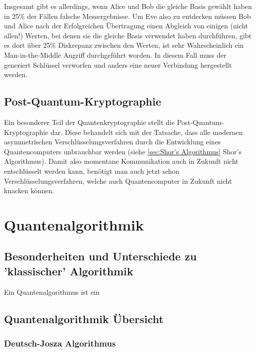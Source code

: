 Insgesamt gibt es allerdings, wenn Alice und Bob die gleiche Basis gewählt haben in 25\% der Fällen falsche Messergebnisse. 
Um Eve also zu entdecken müssen Bob und Alice nach der Erfolgreichen Übertragung einen Abgleich von einigen (nicht allen!) Werten, bei denen sie die gleiche Basis verwendet haben durchführen, gibt es dort über 25\% Diskrepanz zwischen den Werten, ist sehr Wahrscheinlich ein Man-in-the-Middle Angriff durchgeführt worden.
In diesem Fall muss der generiert Schlüssel verworfen und anders eine neuer Verbindung hergestellt werden. 


\subsection{Post-Quantum-Kryptographie}
\label{sec:Post-Quantum-Kryptographie}

Ein besonderer Teil der Quantenkryptographie stellt die Post-Quantum-Kryptographie dar.
Diese behandelt sich mit der Tatsache, dass alle modernen asymmetrischen Verschlüsselungsverfahren durch die Entwicklung eines Quantencomputers unbrauchbar werden (siehe \ref{sec:Shor's Algorithmus} Shor's Algorithmus).
Damit also momentane Kommunikation auch in Zukunft nicht entschlüsselt werden kann, benötigt man auch jetzt schon Verschlüsselungsverfahren, welche auch Quantencomputer in Zukunft nicht knacken können. \cite{postquantumwiki}


\section{Quantenalgorithmik}
\label{sec:Quantenalgorithmik}


\subsection{Besonderheiten und Unterschiede zu 'klassischer' Algorithmik}
\label{sec:Besonderheiten und Unterschiede zu klassischer Algorithmik}

Ein Quantenalgorithmus ist ein 


\subsection{Quantenalgorithmik Übersicht}
\label{sec:Quantenalgorithmik Übersicht}


\subsubsection{Deutsch-Josza Algorithmus}

